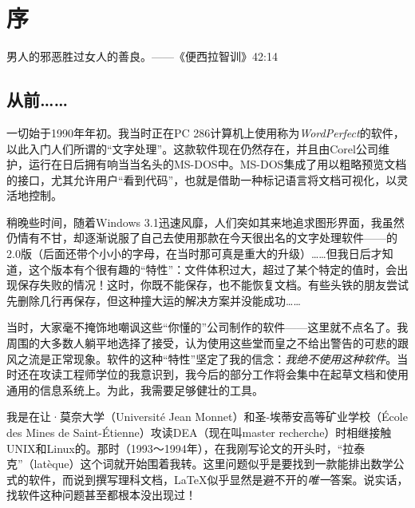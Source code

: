 \chapter*{序}

男人的邪恶胜过女人的善良。——《便西拉智训》42:14

\section*{从前……}

一切始于1990年年初。我当时正在PC 286计算机上使用称为\textit{WordPerfect}的软件，以此入门人们所谓的“文字处理”。这款软件现在仍然存在，并且由Corel公司维护，运行在日后拥有响当当名头的MS-DOS中。MS-DOS集成了用以粗略预览文档的接口，尤其允许用户“看到代码”，也就是借助一种标记语言将文档可视化，以灵活地控制。

稍晚些时间，随着Windows 3.1迅速风靡，人们突如其来地追求图形界面，我虽然仍情有不甘，却逐渐说服了自己去使用那款在今天很出名的文字处理软件——的2.0版（后面还带个小小的字母，在当时那可真是重大的升级）……但我日后才知道，这个版本有个很有趣的“特性”：文件体积过大，超过了某个特定的值时，会出现保存失败的情况！这时，你既不能保存，也不能恢复文档。有些头铁的朋友尝试先删除几行再保存，但这种撞大运的解决方案并没能成功……

当时，大家毫不掩饰地嘲讽这些“你懂的”公司制作的软件——这里就不点名了。我周围的大多数人躺平地选择了接受，认为使用这些堂而皇之不给出警告的可悲的跟风之流是正常现象。软件的这种“特性”坚定了我的信念：\textit{我绝不使用这种软件}。当时还在攻读工程师学位的我意识到，我今后的部分工作将会集中在起草文档和使用通用的信息系统上。为此，我需要足够健壮的工具。

我是在让·莫奈大学（Université Jean Monnet）和圣-埃蒂安高等矿业学校（École des Mines de Saint-Étienne）攻读DEA（现在叫master recherche）时相继接触UNIX和Linux的。那时（1993～1994年），在我刚写论文的开头时，“拉泰克”（latèque）这个词就开始围着我转。这里问题似乎是要找到一款能排出数学公式的软件，而说到撰写理科文档，\LaTeX 似乎显然是避不开的\textit{唯一}答案。说实话，找软件这种问题甚至都根本没出现过！

